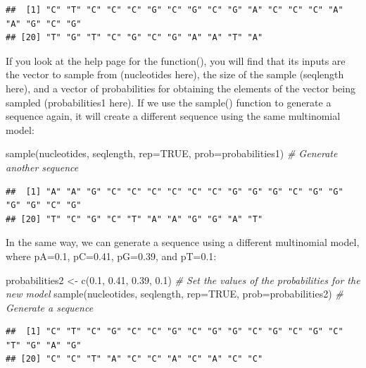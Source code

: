 \documentclass[
]{book}
\newenvironment{Shaded}{\begin{snugshade}}{\end{snugshade}}
\newcommand{\AttributeTok}[1]{\textcolor[rgb]{0.77,0.63,0.00}{#1}}
\newcommand{\CommentTok}[1]{\textcolor[rgb]{0.56,0.35,0.01}{\textit{#1}}}
\newcommand{\ConstantTok}[1]{\textcolor[rgb]{0.00,0.00,0.00}{#1}}
\newcommand{\FloatTok}[1]{\textcolor[rgb]{0.00,0.00,0.81}{#1}}
\newcommand{\FunctionTok}[1]{\textcolor[rgb]{0.00,0.00,0.00}{#1}}
\newcommand{\NormalTok}[1]{#1}
\newcommand{\OtherTok}[1]{\textcolor[rgb]{0.56,0.35,0.01}{#1}}
\begin{document}
\begin{verbatim}
##  [1] "C" "T" "C" "C" "C" "G" "C" "G" "C" "G" "A" "C" "C" "C" "A" "A" "G" "C" "G"
## [20] "T" "G" "T" "C" "G" "C" "G" "A" "A" "T" "A"
\end{verbatim}

If you look at the help page for the function(), you will find that its inputs are the vector to sample from (nucleotides here), the size of the sample (seqlength here), and a vector of probabilities for obtaining the elements of the vector being sampled (probabilities1 here). If we use the sample() function to generate a sequence again, it will create a different sequence using the same multinomial model:

\begin{Shaded}
\begin{Highlighting}[]
\FunctionTok{sample}\NormalTok{(nucleotides, seqlength, }\AttributeTok{rep=}\ConstantTok{TRUE}\NormalTok{, }\AttributeTok{prob=}\NormalTok{probabilities1) }\CommentTok{\# Generate another sequence}
\end{Highlighting}
\end{Shaded}

\begin{verbatim}
##  [1] "A" "A" "G" "C" "C" "C" "C" "C" "C" "G" "G" "G" "C" "G" "G" "G" "G" "C" "G"
## [20] "T" "C" "G" "C" "T" "A" "A" "G" "G" "A" "T"
\end{verbatim}

In the same way, we can generate a sequence using a different multinomial model, where pA=0.1, pC=0.41, pG=0.39, and pT=0.1:

\begin{Shaded}
\begin{Highlighting}[]
\NormalTok{probabilities2 }\OtherTok{\textless{}{-}} \FunctionTok{c}\NormalTok{(}\FloatTok{0.1}\NormalTok{, }\FloatTok{0.41}\NormalTok{, }\FloatTok{0.39}\NormalTok{, }\FloatTok{0.1}\NormalTok{) }\CommentTok{\# Set the values of the probabilities for the new model}
\FunctionTok{sample}\NormalTok{(nucleotides, seqlength, }\AttributeTok{rep=}\ConstantTok{TRUE}\NormalTok{, }\AttributeTok{prob=}\NormalTok{probabilities2) }\CommentTok{\# Generate a sequence}
\end{Highlighting}
\end{Shaded}

\begin{verbatim}
##  [1] "C" "T" "C" "G" "C" "C" "G" "C" "G" "G" "C" "G" "C" "G" "C" "T" "G" "A" "G"
## [20] "C" "C" "T" "A" "C" "C" "A" "C" "A" "C" "C"
\end{verbatim}
\end{document}
